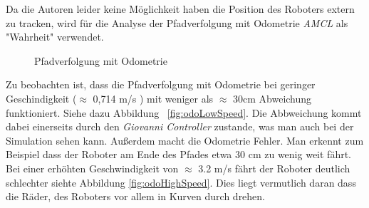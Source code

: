 \documentclass[11pt,a4paper]{article}
\begin{document}
{Da die Autoren leider keine M\"oglichkeit haben die Position des Roboters extern zu tracken, wird f\"ur die Analyse der Pfadverfolgung mit Odometrie \textit{AMCL} als "Wahrheit" verwendet.
\newpage
\begin{figure}
	\centering
	\caption{Pfadverfolgung mit Odometrie}
\end{figure}

Zu beobachten ist, dass die Pfadverfolgung mit Odometrie bei geringer Geschindigkeit ($\approx$ 0,714 m/s ) mit weniger als $\approx$ 30cm Abweichung funktioniert. Siehe dazu Abbildung ~\ref{fig:odoLowSpeed}. Die Abbweichung kommt dabei einerseits durch den \textit{Giovanni Controller} zustande, was man auch bei der Simulation sehen kann. Außerdem macht die Odometrie Fehler. Man erkennt zum Beispiel dass der Roboter am Ende des Pfades etwa 30 cm zu wenig weit f\"ahrt.
Bei einer erhöhten Geschwindigkeit von $\approx$ 3.2 m/s fährt der Roboter deutlich schlechter siehte Abbildung \ref{fig:odoHighSpeed}. Dies liegt vermutlich daran dass die R\"ader, des Roboters vor allem in Kurven durch drehen.   

\newpage  

}
\end{document}

